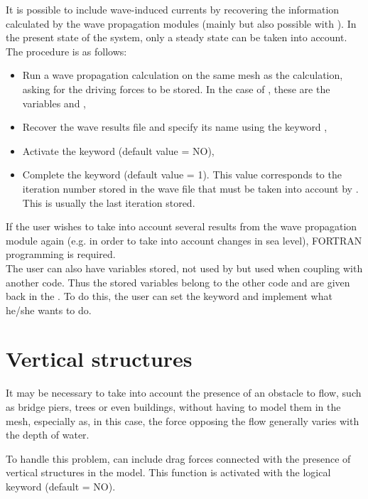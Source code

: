 It is possible to include wave-induced currents by recovering the information
calculated by the wave propagation modules (mainly \tomawac but also possible
with \artemis).
In the present state of the system, only a steady state can be taken into
account.
The procedure is as follows:

\begin{itemize}
\item Run a wave propagation calculation on the same mesh as the 
calculation, asking for the driving forces to be stored.
In the case of \tomawac, these are the variables  and ,

\item Recover the wave results file and specify its name using the keyword
,

\item Activate the keyword  (default value = NO),

\item Complete the keyword 
(default value = 1).
This value corresponds to the iteration number stored in the wave file that must
be taken into account by . This is usually the last iteration stored.
\end{itemize}

If the user wishes to take into account several results from the wave
propagation module again (e.g. in order to take into account changes in sea
level), FORTRAN programming is required.\\

The user can also have variables stored, not used by  but used
when coupling  with another code.
Thus the stored variables belong to the other code and are given back
in the .
To do this, the user can set the 
keyword and implement what he/she wants to do.


\section{Vertical structures}

It may be necessary to take into account the presence of an obstacle to flow,
such as bridge piers, trees or even buildings, without having to model them in
the mesh, especially as, in this case, the force opposing the flow generally
varies with the depth of water.

To handle this problem,  can include drag forces connected with the
presence of vertical structures in the model.
This function is activated with the logical keyword 
(default = NO).

